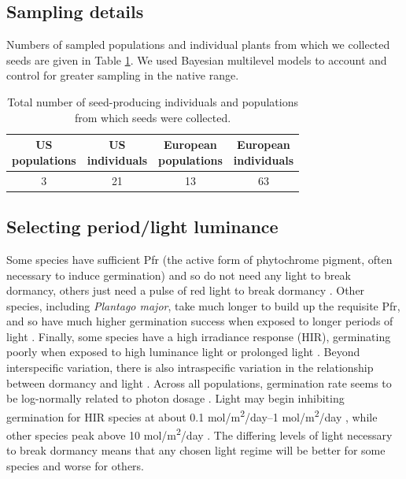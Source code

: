\documentclass[12pt]{article}\usepackage[]{graphicx}\usepackage[]{color}
\begin{document}
\subsection{Sampling details}
Numbers of sampled populations and individual plants from which we collected seeds are given in Table \ref{tab:seednum}. We used Bayesian multilevel models to account and control for   greater sampling in the native range. %
	\begin{center}
		\begin{table}[H]
			\centering
			\caption {Total number of seed-producing individuals and populations from which seeds were collected.} \label{tab:seeds}  
			\begin{tabular}{c|c|c|c}
				\makecell{\textbf{US} \\ \textbf{populations}} & \makecell{\textbf{US} \\  \textbf{individuals}} & \makecell{\textbf{European} \\ \textbf{populations}} & \makecell{\textbf{European} \\ \textbf{individuals}} \\
				\hline
				3&	21&	13&	63\\
			\end{tabular}
			\label{tab:seednum}
		\end{table}
	\end{center}
	
\subsection{Selecting period/light luminance}
Some species have sufficient Pfr (the active form of phytochrome pigment, often necessary to induce germination) and so do not need any light to break dormancy, others just need a pulse of red light to break dormancy \parencite[the red light converts the inactive phytochrome into Pfr,][]{Casal998}.  Other species, including \textit{Plantago major}, take much longer to build up the requisite Pfr, and so have much higher germination success when exposed to longer periods of light \parencite[with nearly 100\% germination after 48 hours of exposure for \textit{P. major},][]{Pons1991}. Finally, some species have a high irradiance response (HIR), germinating poorly when exposed to high luminance light or prolonged light \parencite{Roberts1987}. Beyond interspecific variation, there is also intraspecific variation in the relationship between dormancy and light \parencite{Probert1986}. Across all populations, germination rate seems to be log-normally related to photon dosage \parencite{Ellis1986}. Light may begin inhibiting germination for HIR species at about 0.1 mol/m\textsuperscript{2}/day--1 mol/m\textsuperscript{2}/day \parencite{Baskin1998,Ellis1986}, while other species peak above 10 mol/m\textsuperscript{2}/day \parencite{Ellis1986}. The differing levels of light necessary to break dormancy means that any chosen light regime will be better for some species and worse for others. 
	
\end{document}
